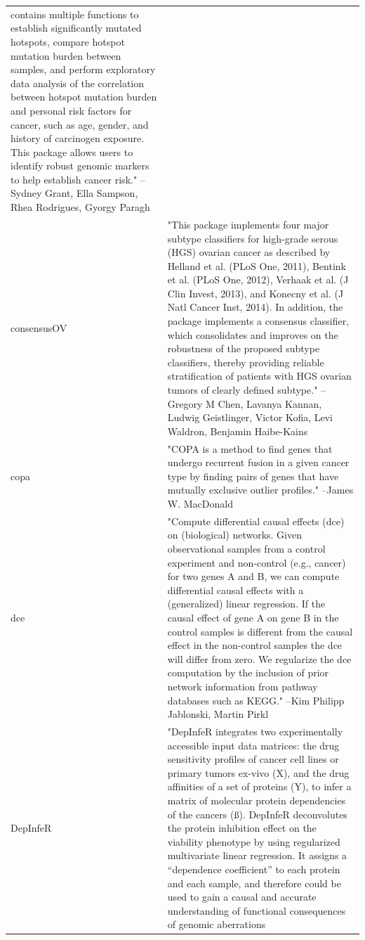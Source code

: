 \begin{longtable}[t]{l>{\raggedright\arraybackslash}p{25em}}
contains multiple functions to establish significantly mutated
hotspots, compare hotspot mutation burden between samples, and
perform exploratory data analysis of the correlation between
hotspot mutation burden and personal risk factors for cancer,
such as age, gender, and history of carcinogen exposure. This
package allows users to identify robust genomic markers to help
establish cancer risk." --Sydney Grant, Ella Sampson, Rhea Rodrigues, Gyorgy Paragh\\
consensusOV & "This package implements four major subtype classifiers for
high-grade serous (HGS) ovarian cancer as described by Helland
et al. (PLoS One, 2011), Bentink et al. (PLoS One, 2012),
Verhaak et al. (J Clin Invest, 2013), and Konecny et al. (J
Natl Cancer Inst, 2014). In addition, the package implements a
consensus classifier, which consolidates and improves on the
robustness of the proposed subtype classifiers, thereby
providing reliable stratification of patients with HGS ovarian
tumors of clearly defined subtype." --Gregory M Chen, Lavanya Kannan, Ludwig Geistlinger, Victor Kofia, Levi Waldron, Benjamin Haibe-Kains\\
\addlinespace
copa & "COPA is a method to find genes that undergo recurrent
fusion in a given cancer type by finding pairs of genes that
have mutually exclusive outlier profiles." --James W. MacDonald\\
dce & "Compute differential causal effects (dce) on (biological)
networks. Given observational samples from a control experiment
and non-control (e.g., cancer) for two genes A and B, we can
compute differential causal effects with a (generalized) linear
regression. If the causal effect of gene A on gene B in the
control samples is different from the causal effect in the
non-control samples the dce will differ from zero. We
regularize the dce computation by the inclusion of prior
network information from pathway databases such as KEGG." --Kim Philipp Jablonski, Martin Pirkl\\
DepInfeR & "DepInfeR integrates two experimentally accessible input
data matrices: the drug sensitivity profiles of cancer cell
lines or primary tumors ex-vivo (X), and the drug affinities of
a set of proteins (Y), to infer a matrix of molecular protein
dependencies of the cancers (ß). DepInfeR deconvolutes the
protein inhibition effect on the viability phenotype by using
regularized multivariate linear regression. It assigns a
“dependence coefficient” to each protein and each sample, and
therefore could be used to gain a causal and accurate
understanding of functional consequences of genomic aberrations

\end{longtable}
